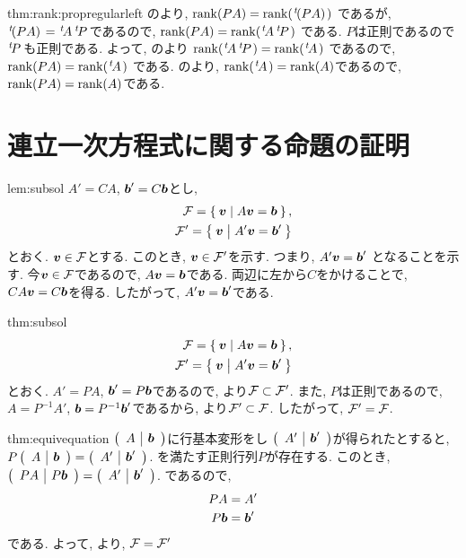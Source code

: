 \begin{proofof*}{thm:rank:prop}{regularleft}
  のより,
  $\rank(PA)=\rank(\transposed{(PA)})$
  であるが, $\transposed{(PA)}=\transposed{A}\transposed{P}$であるので,
  $\rank(PA)=\rank(\transposed{A}\transposed{P})$
  である.
  $P$は正則であるので$\transposed{P}$も正則である.
  よって, のより
  $\rank(\transposed{A}\transposed{P})=\rank(\transposed{A})$
  であるので,
  $\rank(PA)=\rank(\transposed{A})$
  である.
  のより,
  $\rank(\transposed{A})=\rank(A)$であるので,
  $\rank(PA)= \rank(A)$である.
\end{proofof*}

\section{連立一次方程式に関する命題の証明}
\begin{proofof}{lem:subsol}
$A'=CA$, $\bbb'=C\bbb$とし,
  \begin{align*}
  \FFF=\Set{\vv|A\vv=\bbb},\\
  \FFF'=\Set{\vv|A'\vv=\bbb'}
\end{align*}
  とおく.
  $\vv\in \FFF$とする.
  このとき, $\vv\in\FFF'$を示す.
  つまり, $A'\vv=\bbb'$
  となることを示す.
  今$\vv\in \FFF$であるので,
  $A\vv=\bbb$である.
  両辺に左から$C$をかけることで,
  $CA\vv=C\bbb$を得る.
  したがって,
  $A'\vv=\bbb'$である. 
\end{proofof}

\begin{proofof}{thm:subsol}
  \begin{align*}
  \FFF=\Set{\vv|A\vv=\bbb},\\
  \FFF'=\Set{\vv|A'\vv=\bbb'}
  \end{align*}
  とおく.
$A'=PA$, $\bbb'=P\bbb$であるので,
  より$\FFF\subset\FFF'$.
  また,
  $P$は正則であるので,
  $A=P^{-1}A'$,
  $\bbb=P^{-1}\bbb'$であるから,
  より$\FFF'\subset\FFF$.
  したがって, $\FFF'=\FFF$.
\end{proofof}
\begin{proofof}{thm:equivequation}
  $\hconcat{A}{\bbb}$に行基本変形をし
  $\hconcat{A'}{\bbb'}$が得られたとすると,
  $P\hconcat{A}{\bbb}=\hconcat{A'}{\bbb'}$.
  を満たす正則行列$P$が存在する.
  このとき,
  $\hconcat{PA}{P\bbb}=\hconcat{A'}{\bbb'}$.
  であるので,
  \begin{align*}
    PA&=A'\\
    P\bbb&=\bbb'
  \end{align*}
  である.
  よって, より,
  $\FFF=\FFF'$
\end{proofof}

